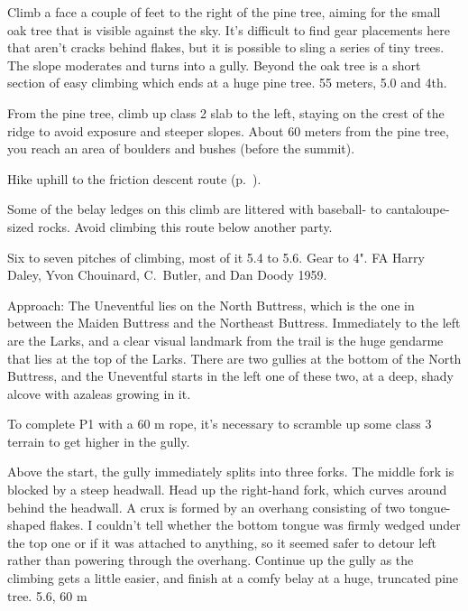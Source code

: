 \documentclass{tahquitz}
\begin{document}
 Climb a face a couple of feet to the right of the pine tree,
aiming for the small oak tree that is visible against the sky. It's
difficult to find gear placements here that aren't cracks behind
flakes, but it is possible to sling a series of tiny trees. The slope
moderates and turns into a gully. Beyond the oak tree is a short
section of easy climbing which ends at a huge pine tree. 55 meters,
5.0 and 4th.

From the pine tree, climb up class 2 slab to the left, staying on
the crest of the ridge to avoid exposure and steeper slopes. About 60
meters from the pine tree, you reach an area of boulders and bushes
(before the summit).

Hike uphill to the friction descent route (p.~\pageref{subsec:friction-descent}).





Some of the belay ledges on this climb
are littered with baseball- to cantaloupe-sized rocks.
Avoid climbing this route below
another party.

Six to seven pitches of climbing, most of it 5.4 to 5.6. Gear to 4".
FA Harry Daley, Yvon Chouinard, C.~Butler, and Dan Doody 1959.

Approach: The Uneventful lies on the North Buttress, which is the one
in between the Maiden Buttress and the Northeast Buttress. Immediately
to the left are the Larks, and a clear visual landmark from the trail
is the huge gendarme that lies at the top of the Larks. There are two
gullies at the bottom of the North Buttress, and the Uneventful starts in the
left one of these two, at a deep, shady alcove with azaleas
growing in it.

To complete P1 with a 60 m rope, it's necessary to scramble up some
class 3 terrain to get higher in the gully.

 Above the start, the gully immediately splits into three
forks. The middle fork is blocked by a steep headwall.
Head up the right-hand fork, which curves around behind
the headwall. A crux is formed by an overhang consisting 
of two tongue-shaped flakes.
I couldn't tell whether the bottom tongue was firmly wedged under the top
one or if it was attached to anything, so it seemed safer to detour left
rather than powering through the overhang. Continue up the gully as the
climbing gets a little easier, and finish at a comfy belay at a huge,
truncated pine tree. 5.6, 60 m
\end{document}

